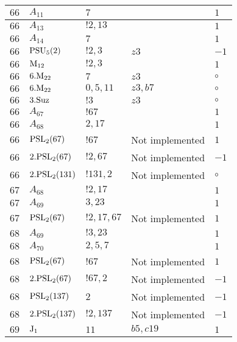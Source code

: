 \documentclass[a4paper, 11pt]{article}
\begin{document}
\begin{longtable}{lllll}
        $ 66 $ & $ A_{11} $ & $ 7 $ & $ ~ $ & $ 1$ \\ \hline
        $ 66 $ & $ A_{13} $ & $ ! 2,13 $ & $ ~ $ & $ 1$ \\ \hline
        $ 66 $ & $ A_{14} $ & $ 7 $ & $ ~ $ & $ 1$ \\ \hline
        $ 66 $ & $ {\rm PSU}_{5}(2) $ & $ ! 2,3 $ & $ z3 $ & $ -1$ \\ \hline
        $ 66 $ & $ {\rm M}_{12} $ & $ ! 2,3 $ & $ ~ $ & $ 1$ \\ \hline
        $ 66 $ & $ 6.{\rm M}_{22} $ & $ 7 $ & $ z3 $ &  $\circ$ \\ \hline
        $ 66 $ & $ 6.{\rm M}_{22} $ & $ 0,5,11 $ & $ z3, b7 $ &  $\circ$ \\ \hline
        $ 66 $ & $ 3.{\rm Suz} $ & $ ! 3 $ & $ z3 $ &  $\circ$ \\ \hline
        $ 66 $ & $ A_{67} $ & $ !67 $ & $ ~ $ & $ 1$ \\ \hline
        $ 66 $ & $ A_{68} $ & $ 2, 17 $ & $ ~ $ & $ 1$ \\ \hline
        $ 66 $ & $ {\rm PSL}_{2}(67) $ & $ !67 $ &  Not implemented & $ 1$ \\ \hline
        $ 66 $ & $ 2.{\rm PSL}_{2}(67) $ & $ !2, 67 $ &  Not implemented & $ -1$ \\ \hline
        $ 66 $ & $ 2.{\rm PSL}_{2}(131) $ & $ !131, 2 $ &  Not implemented &  $\circ$ \\ \hline
        $ 67 $ & $ A_{68} $ & $ !2, 17 $ & $ ~ $ & $ 1$ \\ \hline
        $ 67 $ & $ A_{69} $ & $ 3, 23 $ & $ ~ $ & $ 1$ \\ \hline
        $ 67 $ & $ {\rm PSL}_{2}(67) $ & $ !2, 17, 67 $ &  Not implemented & $ 1$ \\ \hline
        $ 68 $ & $ A_{69} $ & $ !3, 23 $ & $ ~ $ & $ 1$ \\ \hline
        $ 68 $ & $ A_{70} $ & $ 2, 5, 7 $ & $ ~ $ & $ 1$ \\ \hline
        $ 68 $ & $ {\rm PSL}_{2}(67) $ & $ !67 $ &  Not implemented & $ 1$ \\ \hline
        $ 68 $ & $ 2.{\rm PSL}_{2}(67) $ & $ !67, 2 $ &  Not implemented & $ -1$ \\ \hline
        $ 68 $ & $ {\rm PSL}_{2}(137) $ & $ 2 $ &  Not implemented & $ -1$ \\ \hline
        $ 68 $ & $ 2.{\rm PSL}_{2}(137) $ & $ !2, 137 $ &  Not implemented & $ -1$ \\ \hline
        $ 69 $ & $ {\rm J}_1 $ & $ 11 $ & $ b5, c19 $ & $ 1$ \\ \hline

\end{longtable}
\end{document}
